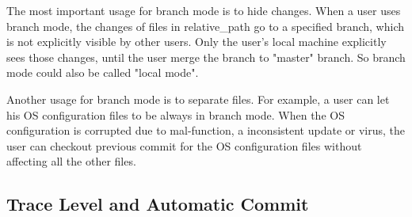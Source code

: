 The most important usage for branch mode is to hide changes. When a user
uses branch mode, the changes of files in relative\_path go to a specified
branch, which is not explicitly visible by other users. Only the user's local
machine explicitly sees those changes, until the user merge the branch to
"master" branch. So branch mode could also be called "local mode".

Another usage for branch mode is to separate files. For example, a user can
let his OS configuration files to be always in branch mode. When the OS
configuration is corrupted due to mal-function, a inconsistent update or virus,
the user can checkout previous commit for the OS configuration files without
affecting all the other files.


\subsection{Trace Level and Automatic Commit}

